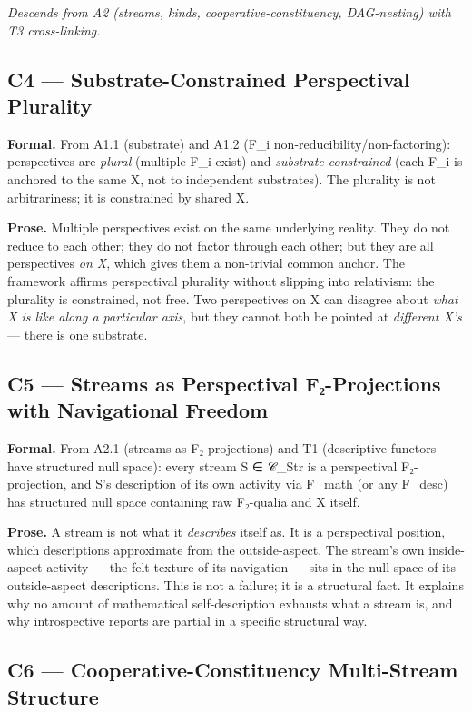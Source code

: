 \documentclass[11pt, openany]{book}
\begin{document}
\textit{Descends from A2 (streams, kinds, cooperative-constituency, DAG-nesting) with T3 cross-linking.}

\subsection{C4 --- Substrate-Constrained Perspectival Plurality}

\textbf{Formal.} From A1.1 (substrate) and A1.2 (F\_\allowbreak{}i non-reducibility/non-factoring): perspectives are \textit{plural} (multiple F\_\allowbreak{}i exist) and \textit{substrate-constrained} (each F\_\allowbreak{}i is anchored to the same X, not to independent substrates). The plurality is not arbitrariness; it is constrained by shared X.

\textbf{Prose.} Multiple perspectives exist on the same underlying reality. They do not reduce to each other; they do not factor through each other; but they are all perspectives \textit{on X}, which gives them a non-trivial common anchor. The framework affirms perspectival plurality without slipping into relativism: the plurality is constrained, not free. Two perspectives on X can disagree about \textit{what X is like along a particular axis}, but they cannot both be pointed at \textit{different X's} --- there is one substrate.

\subsection{C5 --- Streams as Perspectival F₂-Projections with Navigational Freedom}

\textbf{Formal.} From A2.1 (streams-as-F₂-projections) and T1 (descriptive functors have structured null space): every stream S ∈ 𝒞\_\allowbreak{}Str is a perspectival F₂-projection, and S's description of its own activity via F\_\allowbreak{}math (or any F\_\allowbreak{}desc) has structured null space containing raw F₂-qualia and X itself.

\textbf{Prose.} A stream is not what it \textit{describes} itself as. It is a perspectival position, which descriptions approximate from the outside-aspect. The stream's own inside-aspect activity --- the felt texture of its navigation --- sits in the null space of its outside-aspect descriptions. This is not a failure; it is a structural fact. It explains why no amount of mathematical self-description exhausts what a stream is, and why introspective reports are partial in a specific structural way.

\subsection{C6 --- Cooperative-Constituency Multi-Stream Structure}
\end{document}

